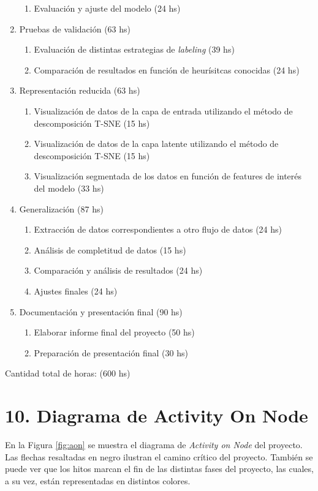 \documentclass[
11pt, %
]{charter}
\begin{document}
\begin{enumerate}
\begin{enumerate}
		\item Evaluación y ajuste del modelo (24 hs)
	\end{enumerate}
\item Pruebas de validación (63 hs)
	\begin{enumerate}
		\item Evaluación de distintas estrategias de \emph{labeling} (39 hs)
		\item Comparación de resultados en función de heurísitcas conocidas (24 hs)
	\end{enumerate}
\item Representación reducida (63 hs)
	\begin{enumerate}
 		\item Visualización de datos de la capa de entrada utilizando el método de descomposición T-SNE (15 hs)
 		\item Visualización de datos de la capa latente utilizando el método de descomposición T-SNE (15 hs)
 		\item Visualización segmentada de los datos en función de features de interés del modelo (33 hs)
 	\end{enumerate}
\item Generalización (87 hs)
 	\begin{enumerate}
 		\item Extracción de datos correspondientes a otro flujo de datos (24 hs)
 		\item Análisis de completitud de datos (15 hs)
 		\item Comparación y análisis de resultados (24 hs)
 		\item Ajustes finales (24 hs)
 	\end{enumerate}
\item Documentación y presentación final (90 hs)
 	\begin{enumerate}
 		\item Elaborar informe final del proyecto (50 hs)
 		\item Preparación de presentación final (30 hs)
 	\end{enumerate}
\end{enumerate}

Cantidad total de horas: (600 hs)

\section{10. Diagrama de Activity On Node}
\label{sec:AoN}

En la Figura \ref{fig:aon} se muestra el diagrama de \emph{Activity on Node} del proyecto. Las flechas resaltadas en negro ilustran el camino crítico del proyecto. También se puede ver que los hitos marcan el fin de las distintas fases del proyecto, las cuales, a su vez, están representadas en distintos colores.
\end{document}
